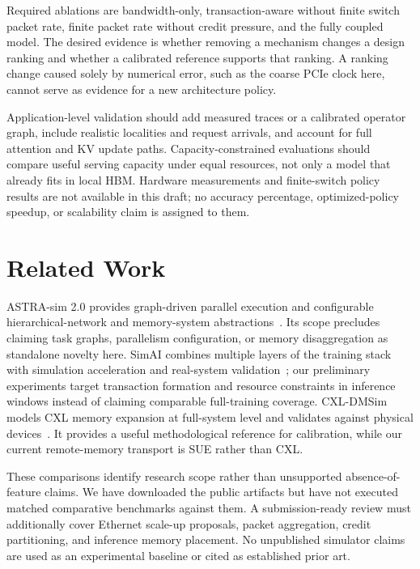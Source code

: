 \documentclass[conference]{IEEEtran}
\begin{document}
Required ablations are bandwidth-only, transaction-aware without finite switch packet rate, finite packet rate without credit pressure, and the fully coupled model. The desired evidence is whether removing a mechanism changes a design ranking and whether a calibrated reference supports that ranking. A ranking change caused solely by numerical error, such as the coarse PCIe clock here, cannot serve as evidence for a new architecture policy.

Application-level validation should add measured traces or a calibrated operator graph, include realistic localities and request arrivals, and account for full attention and KV update paths. Capacity-constrained evaluations should compare useful serving capacity under equal resources, not only a model that already fits in local HBM. Hardware measurements and finite-switch policy results are not available in this draft; no accuracy percentage, optimized-policy speedup, or scalability claim is assigned to them.



\section{Related Work}
ASTRA-sim 2.0 provides graph-driven parallel execution and configurable hierarchical-network and memory-system abstractions~\cite{astra2}. Its scope precludes claiming task graphs, parallelism configuration, or memory disaggregation as standalone novelty here. SimAI combines multiple layers of the training stack with simulation acceleration and real-system validation~\cite{simai}; our preliminary experiments target transaction formation and resource constraints in inference windows instead of claiming comparable full-training coverage. CXL-DMSim models CXL memory expansion at full-system level and validates against physical devices~\cite{cxldmsim}. It provides a useful methodological reference for calibration, while our current remote-memory transport is SUE rather than CXL.

These comparisons identify research scope rather than unsupported absence-of-feature claims. We have downloaded the public artifacts but have not executed matched comparative benchmarks against them. A submission-ready review must additionally cover Ethernet scale-up proposals, packet aggregation, credit partitioning, and inference memory placement. No unpublished simulator claims are used as an experimental baseline or cited as established prior art.
\end{document}

